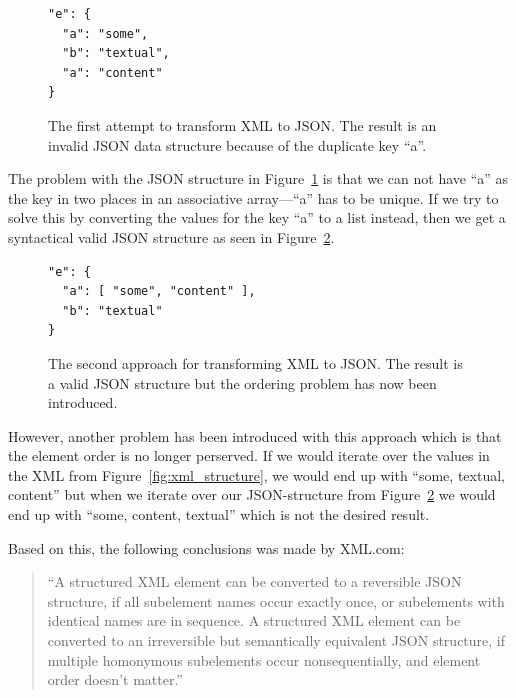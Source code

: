 \documentclass{cslthse-msc}
\begin{document}
\begin{figure}[H]
  \centering
    \begin{center}
\begin{lstlisting}[breaklines=true,frame=single]
"e": {
  "a": "some",
  "b": "textual",
  "a": "content"
}
\end{lstlisting}
    \end{center}
  \caption{The first attempt to transform XML to JSON. The result is an invalid JSON data structure because of the duplicate key \enquote{a}.}
  \label{fig:xml_wrong}
\end{figure}

The problem with the JSON structure in Figure~\ref{fig:xml_wrong} is that we can not have \enquote{a} as the key in two places in an associative array---\enquote{a} has to be unique. If we try to solve this by converting the values for the key \enquote{a} to a list instead, then we get a syntactical valid JSON structure as seen in Figure~\ref{fig:json_wrong}.

\begin{figure}[H]
  \centering
    \begin{center}
\begin{lstlisting}[breaklines=true,frame=single]
"e": {
  "a": [ "some", "content" ],
  "b": "textual"
}
\end{lstlisting}
    \end{center}
  \caption{The second approach for transforming XML to JSON. The result is a valid JSON structure but the ordering problem has now been introduced.}
  \label{fig:json_wrong}
\end{figure}

However, another problem has been introduced with this approach which is that the element order is no longer perserved. If we would iterate over the values in the XML from Figure~\ref{fig:xml_structure}, we would end up with \enquote{some, textual, content} but when we iterate over our JSON-structure from Figure~\ref{fig:json_wrong} we would end up with \enquote{some, content, textual} which is not the desired result.

\vspace{5mm}
\noindent Based on this, the following conclusions was made by XML.com:

\begin{quote}

\enquote{A structured XML element can be converted to a reversible JSON structure, if all subelement names occur exactly once, or subelements with identical names are in sequence. A structured XML element can be converted to an irreversible but semantically equivalent JSON structure, if multiple homonymous subelements occur nonsequentially, and element order doesn't matter.} \cite{xml_json}

\end{quote}
\end{document}
